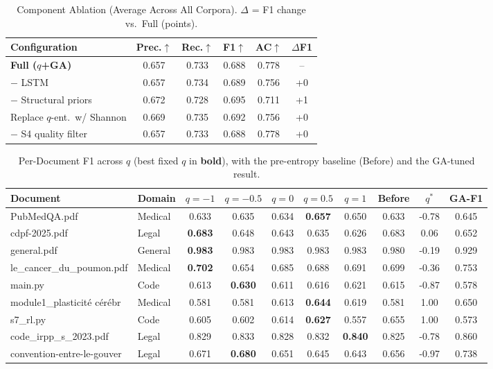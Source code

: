 \begin{table}[t]\centering
\caption{Component Ablation (Average Across All Corpora). $\Delta$ = F1 change vs.\ Full (points).}
\label{tab:ablation}
\begin{tabular}{@{}lccccc@{}}\toprule
Configuration & Prec.$\uparrow$ & Rec.$\uparrow$ & F1$\uparrow$ & AC$\uparrow$ & $\Delta$F1 \\\midrule
\textbf{Full ($q$+GA)} & 0.657 & 0.733 & 0.688 & 0.778 & -- \\
$-$ LSTM & 0.657 & 0.734 & 0.689 & 0.756 & +0 \\
$-$ Structural priors & 0.672 & 0.728 & 0.695 & 0.711 & +1 \\
Replace $q$-ent.\ w/ Shannon & 0.669 & 0.735 & 0.692 & 0.756 & +0 \\
$-$ S4 quality filter & 0.657 & 0.733 & 0.688 & 0.778 & +0 \\
\bottomrule\end{tabular}\end{table}

\begin{table}[t]\centering
\caption{Per-Document F1 across $q$ (best fixed $q$ in \textbf{bold}), with the pre-entropy baseline (Before) and the GA-tuned result.}
\label{tab:perdoc}
\begin{tabular}{@{}llcccccccc@{}}\toprule
Document & Domain & $q=-1$ & $q=-0.5$ & $q=0$ & $q=0.5$ & $q=1$ & Before & $q^{*}$ & GA-F1 \\\midrule
PubMedQA.pdf & Medical & 0.633 & 0.635 & 0.634 & \textbf{0.657} & 0.650 & 0.633 & -0.78 & 0.645 \\
cdpf-2025.pdf & Legal & \textbf{0.683} & 0.648 & 0.643 & 0.635 & 0.626 & 0.683 & 0.06 & 0.652 \\
general.pdf & General & \textbf{0.983} & 0.983 & 0.983 & 0.983 & 0.983 & 0.980 & -0.19 & 0.929 \\
le\_cancer\_du\_poumon.pdf & Medical & \textbf{0.702} & 0.654 & 0.685 & 0.688 & 0.691 & 0.699 & -0.36 & 0.753 \\
main.py & Code & 0.613 & \textbf{0.630} & 0.611 & 0.616 & 0.621 & 0.615 & -0.87 & 0.578 \\
module1\_plasticité cérébr & Medical & 0.581 & 0.581 & 0.613 & \textbf{0.644} & 0.619 & 0.581 & 1.00 & 0.650 \\
s7\_rl.py & Code & 0.605 & 0.602 & 0.614 & \textbf{0.627} & 0.557 & 0.655 & 1.00 & 0.573 \\
code\_irpp\_s\_2023.pdf & Legal & 0.829 & 0.833 & 0.828 & 0.832 & \textbf{0.840} & 0.825 & -0.78 & 0.860 \\
convention-entre-le-gouver & Legal & 0.671 & \textbf{0.680} & 0.651 & 0.645 & 0.643 & 0.656 & -0.97 & 0.738 \\
\bottomrule\end{tabular}\end{table}


